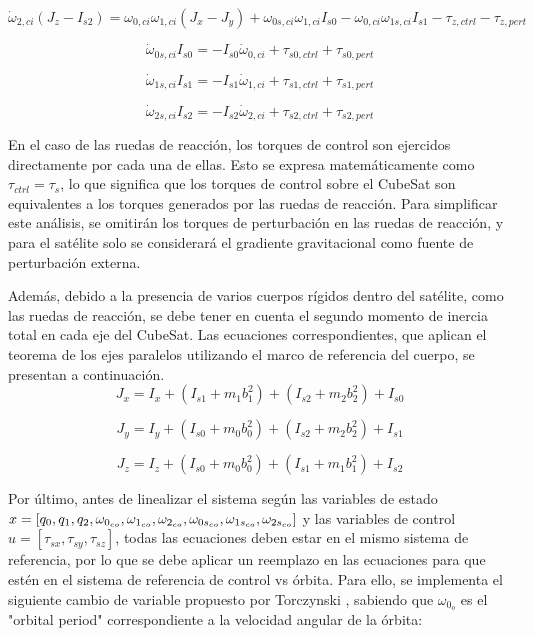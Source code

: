 \begin{equation}
	\dot{\omega}_{2,ci} (J_z - I_{s2}) = \omega_{0,ci} \omega_{1,ci} (J_x - J_y) + \omega_{0s,ci} \omega_{1,ci} I_{s0} - \omega_{0,ci} \omega_{1s,ci} I_{s1} - \tau_{z,ctrl} - \tau_{z,pert}
\end{equation}

\begin{equation}
	\dot{\omega}_{0s,ci} I_{s0} = -I_{s0} \dot{\omega}_{0,ci} + \tau_{s0,ctrl} + \tau_{s0,pert}
\end{equation}

\begin{equation}
	\dot{\omega}_{1s,ci} I_{s1} = -I_{s1} \dot{\omega}_{1,ci} + \tau_{s1,ctrl} + \tau_{s1,pert}
\end{equation}

\begin{equation}
	\dot{\omega}_{2s,ci} I_{s2} = -I_{s2} \dot{\omega}_{2,ci} + \tau_{s2,ctrl} + \tau_{s2,pert}
\end{equation}


En el caso de las ruedas de reacción, los torques de control son ejercidos directamente por cada una de ellas. Esto se expresa matemáticamente como $\tau_{ctrl} = \tau_{s}$, lo que significa que los torques de control sobre el CubeSat son equivalentes a los torques generados por las ruedas de reacción. Para simplificar este análisis, se omitirán los torques de perturbación en las ruedas de reacción, y para el satélite solo se considerará el gradiente gravitacional como fuente de perturbación externa.

Además, debido a la presencia de varios cuerpos rígidos dentro del satélite, como las ruedas de reacción, se debe tener en cuenta el segundo momento de inercia total en cada eje del CubeSat. Las ecuaciones correspondientes, que aplican el teorema de los ejes paralelos utilizando el marco de referencia del cuerpo, se presentan a continuación.
\[
J_x = I_x + (I_{s1} + m_1 b_1^2) + (I_{s2} + m_2 b_2^2) + I_{s0}
\]

\[
J_y = I_y + (I_{s0} + m_0 b_0^2) + (I_{s2} + m_2 b_2^2) + I_{s1}
\]

\[
J_z = I_z + (I_{s0} + m_0 b_0^2) + (I_{s1} + m_1 b_1^2) + I_{s2}
\]

Por último, antes de linealizar el sistema según las variables de estado $x = [q_0, q_1, q_2, \omega_{0_{co}}, \omega_{1_{co}},\\ \omega_{2_{co}}, \omega_{0s_{co}}, \omega_{1s_{co}}, \omega_{2s_{co}}]$ y las variables de control $u = [\tau_{sx}, \tau_{sy}, \tau_{sz}]$, todas las ecuaciones deben estar en el mismo sistema de referencia, por lo que se debe aplicar un reemplazo en las ecuaciones para que estén en el sistema de referencia de control vs órbita. Para ello, se implementa el siguiente cambio de variable propuesto por Torczynski \cite{ref14}, sabiendo que $\omega_{0_o}$ es el "orbital period" correspondiente a la velocidad angular de la órbita:

